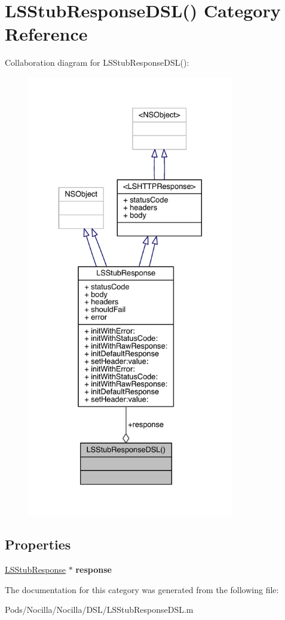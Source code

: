 \hypertarget{category_l_s_stub_response_d_s_l_07_08}{\section{L\-S\-Stub\-Response\-D\-S\-L() Category Reference}
\label{category_l_s_stub_response_d_s_l_07_08}
}


Collaboration diagram for L\-S\-Stub\-Response\-D\-S\-L()\-:\nopagebreak
\begin{figure}[H]
\begin{center}
\leavevmode
\includegraphics[height=550pt]{category_l_s_stub_response_d_s_l_07_08__coll__graph}
\end{center}
\end{figure}
\subsection*{Properties}
\begin{DoxyCompactItemize}
\item 
\hypertarget{category_l_s_stub_response_d_s_l_07_08_a3d5a98bf295b5d339e973a20178671fb}{\hyperlink{interface_l_s_stub_response}{L\-S\-Stub\-Response} $\ast$ {\bfseries response}}\label{category_l_s_stub_response_d_s_l_07_08_a3d5a98bf295b5d339e973a20178671fb}

\end{DoxyCompactItemize}


The documentation for this category was generated from the following file\-:\begin{DoxyCompactItemize}
\item 
Pods/\-Nocilla/\-Nocilla/\-D\-S\-L/L\-S\-Stub\-Response\-D\-S\-L.\-m\end{DoxyCompactItemize}
